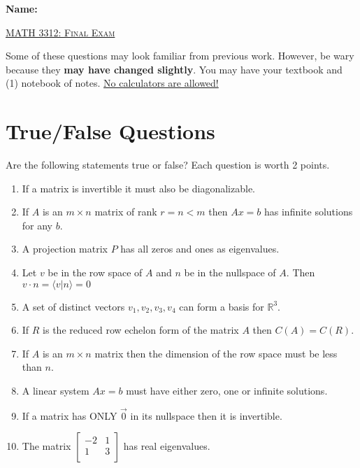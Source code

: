 \documentclass[12pt, a4paper]{article}
\theoremstyle{break}
\begin{document}
\begin{flushleft}
\Large \textbf{Name: } \underline{\hspace{8cm}} \\
\end{flushleft}
\vspace{0.25in}
\begin{center}
{\Large \textsc{\underline{MATH 3312: Final Exam}}}
\vspace{0.125in}
\end{center}
Some of these questions may look familiar from previous work. However, be wary because they \textbf{may have changed slightly}. You may have your textbook and (1) notebook of notes. \underline{No calculators are allowed!}
\section{True/False Questions}
Are the following statements true or false? Each question is worth 2 points. 
\begin{enumerate}
\item \underline{\hspace{1cm}} If a matrix is invertible it must also be diagonalizable. 
\item \underline{\hspace{1cm}}  If $A$ is an $m\times n$ matrix of rank $r=n<m$ then $Ax=b$ has infinite solutions for any $b$. 
\item \underline{\hspace{1cm}} A projection matrix $P$ has all zeros and ones as eigenvalues. 
\item \underline{\hspace{1cm}} Let $v$ be in the row space of $A$ and $n$ be in the nullspace of $A$. Then $v \cdot n=\langle v | n \rangle=0$
\item \underline{\hspace{1cm}} A set of distinct vectors $v_1, v_2, v_3, v_4$ can form a basis for $\mathbb{R}^3$. 
\item \underline{\hspace{1cm}} If $R$ is the reduced row echelon form of the matrix $A$ then $C(A)=C(R)$. 
\item  \underline{\hspace{1cm}} If $A$ is an $m \times n$ matrix then the dimension of the row space must be less than $n$. 
\item  \underline{\hspace{1cm}} A linear system $Ax=b$ must have either zero, one or infinite solutions. 
\item  \underline{\hspace{1cm}} If a matrix has ONLY $\vec{0}$ in its nullspace then it is invertible.
\item  \underline{\hspace{1cm}} The matrix $
\begin{bmatrix}
-2 & 1 \\
1 & 3 \\
\end{bmatrix}$
has real eigenvalues.
\end{enumerate}
\newpage
\end{document}
